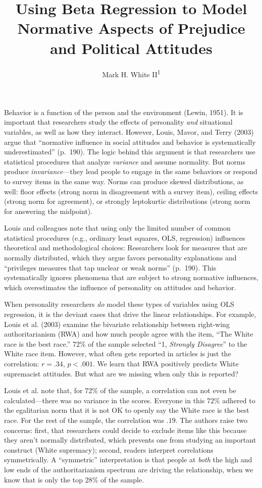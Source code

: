\documentclass[english,man]{apa6}
\title{Using Beta Regression to Model Normative Aspects of Prejudice and
Political Attitudes}
\author{Mark H. White II\textsuperscript{1}}
\affiliation{
    \vspace{0.5cm}
          \textsuperscript{1} University of Kansas  }
\newcounter{author}
\theoremstyle{definition}
\theoremstyle{definition}
\theoremstyle{remark}
\begin{document}
\maketitle

\setcounter{secnumdepth}{0}



Behavior is a function of the person and the environment (Lewin, 1951).
It is important that researchers study the effects of personality
\emph{and} situational variables, as well as how they interact. However,
Louis, Mavor, and Terry (2003) argue that \enquote{normative influence
in social attitudes and behavior is systematically underestimated}
(p.~190). The logic behind this argument is that researchers use
statistical procedures that analyze \emph{variance} and assume
normality. But norms produce \emph{invariance}---they lead people to
engage in the same behaviors or respond to survey items in the same way.
Norms can produce skewed distributions, as well: floor effects (strong
norm in disagreement with a survey item), ceiling effects (strong norm
for agreement), or strongly leptokurtic distributions (strong norm for
answering the midpoint).

Louis and colleagues note that using only the limited number of common
statistical procedures (e.g., ordinary least squares, OLS, regression)
influences theoretical and methodological choices: Researchers look for
measures that are normally distributed, which they argue favors
personality explanations and \enquote{privileges measures that tap
unclear or weak norms} (p.~190). This systematically ignores phenomena
that are subject to strong normative influences, which overestimates the
influence of personality on attitudes and behavior.

When personality researchers \emph{do} model these types of variables
using OLS regression, it is the deviant cases that drive the linear
relationships. For example, Louis et al. (2003) examine the bivariate
relationship between right-wing authoritarianism (RWA) and how much
people agree with the item, \enquote{The White race is the best race.}
72\% of the sample selected \enquote{1, \emph{Strongly Disagree}} to the
White race item. However, what often gets reported in articles is just
the correlation: \(r = .34\), \(p < .001\). We learn that RWA positively
predicts White supremacist attitudes. But what are we missing when only
this is reported?

Louis et al. note that, for 72\% of the sample, a correlation can not
even be calculated---there was no variance in the scores. Everyone in
this 72\% adhered to the egalitarian norm that it is not OK to openly
say the White race is the best race. For the rest of the sample, the
correlation was \(.19\). The authors raise two concerns: first, that
researchers could decide to exclude items like this because they aren't
normally distributed, which prevents one from studying an important
construct (White supremacy); second, readers interpret correlations
symmetrically. A \enquote{symmetric} interpretation is that people at
\emph{both} the high and low ends of the authoritarianism spectrum are
driving the relationship, when we know that is only the top 28\% of the
sample.
\end{document}
